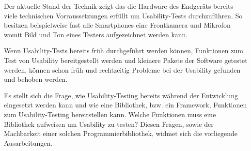 Der aktuelle Stand der Technik zeigt das die Hardware des Endgeräts bereits viele technischen Vorraussetzungen erfüllt um Usability-Tests durchzuführen. So besitzen beispielweise fast alle Smartphones eine Frontkamera und Mikrofon womit Bild und Ton eines Testers aufgezeichnet werden kann. 

Wenn Usability-Tests bereits früh durchgeführt werden können, Funktionen zum Test von Usability bereitgestellt werden und kleinere Pakete der Software getestet werden, können schon früh und rechtzeitig Probleme bei der Usability gefunden und behoben werden.

Es stellt sich die Frage, wie Usability-Testing bereits während der Entwicklung eingesetzt werden kann und wie eine Bibliothek, bzw. ein Framework, Funktionen zum Usability-Testing bereitstellen kann. Welche Funktionen muss eine Bibliothek aufweisen um Usability zu testen? Diesen Fragen, sowie der Machbarkeit einer solchen Programmierbibliothek, widmet sich die vorliegende Ausarbeitungen. 




\cite{usabilityEngineeringKompakt}

\cite{nodejs_therightway}